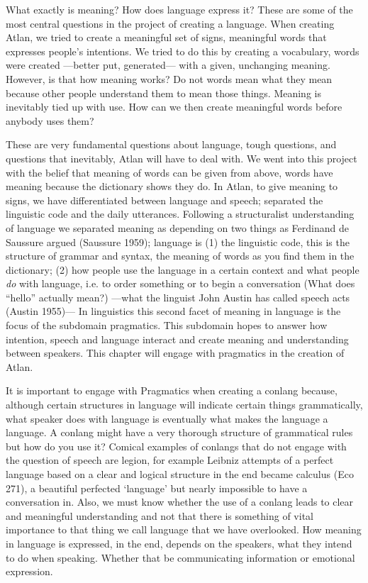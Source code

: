 What exactly is meaning? How does language express it? These are some of the most central questions in the project of creating a language. When creating Atlan, we tried to create a meaningful set of signs, meaningful words that expresses people's intentions. We tried to do this by creating a vocabulary, words were created —better put, generated— with a given, unchanging meaning. However, is that how meaning works? Do not words mean what they mean because other people understand them to mean those things. Meaning is inevitably tied up with use. How can we then create meaningful words before anybody uses them? 

These are very fundamental questions about language, tough questions, and questions that inevitably, Atlan will have to deal with. We went into this project with the belief that meaning of words can be given from above, words have meaning because the dictionary shows they do. In Atlan, to give meaning to signs, we have differentiated between language and speech; separated the linguistic code and the daily utterances. Following a structuralist understanding of language we separated meaning as depending on two things as Ferdinand de Saussure argued (Saussure 1959); language is (1) the linguistic code, this is the structure of grammar and syntax, the meaning of words as you find them in the dictionary; (2) how people use the language in a certain context and what people \textit{do} with language, i.e. to order something or to begin a conversation (What does “hello” actually mean?) —what the linguist John Austin has called speech acts (Austin 1955)— In linguistics this second facet of meaning in language is the focus of the subdomain pragmatics. This subdomain hopes to answer how intention, speech and language interact and create meaning and understanding between speakers. This chapter will engage with pragmatics in the creation of Atlan. 

It is important to engage with Pragmatics when creating a conlang because, although certain structures in language will indicate certain things grammatically, what speaker does with language is eventually what makes the language a language. A conlang might have a very thorough structure of grammatical rules but how do you use it? Comical examples of conlangs that do not engage with the question of speech are legion, for example Leibniz attempts of a perfect language based on a clear and logical structure in the end became calculus (Eco 271), a beautiful perfected ‘language’ but nearly impossible to have a conversation in. Also, we must know whether the use of a conlang leads to clear and meaningful understanding and not that there is something of vital importance to that thing we call language that we have overlooked. How meaning in language is expressed, in the end, depends on the speakers, what they intend to do when speaking. Whether that be communicating information or emotional expression.  

